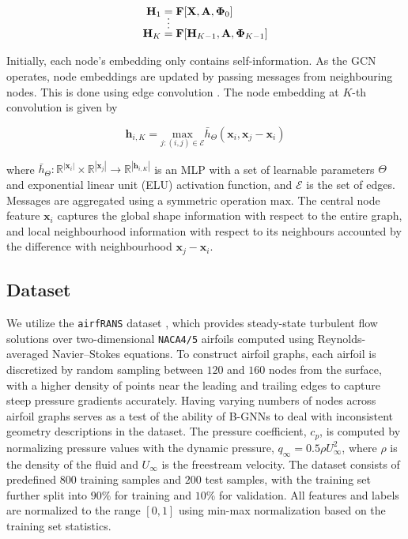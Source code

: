 \documentclass{marine_2025_paper_template}
\begin{document}
\begin{align}
  \mathbf{H}_1 & = \mathbf{F}[\mathbf{X}, \mathbf{A}, \mathbf{\Phi}_{0}] \\
               & \shortvdotswithin{ = } \notag \\[-3.5ex]
  \mathbf{H}_K & = \mathbf{F}[\mathbf{H}_{K-1}, \mathbf{A}, \mathbf{\Phi}_{K-1}]
\end{align}

\noindent
Initially, each node's embedding only contains self-information. As the GCN operates, node embeddings are updated by passing messages from neighbouring nodes. This is done using edge convolution \citep{wang2019}. The node embedding at $K$-th convolution is given by

\begin{equation}
    \mathbf{h}_{i,K} = \underset{j:(i,j)\in \mathcal{E}}{\mathrm{max}} \bar{h}_{\Theta}(\mathbf{x}_i, \mathbf{x}_j - \mathbf{x}_i)
\end{equation}

\noindent where $\bar{h}_{\Theta}: \mathbb{R}^{|\mathbf{x}_i|} \times \mathbb{R}^{|\mathbf{x}_j|} \rightarrow \mathbb{R}^{|\mathbf{h}_{i,K}|}$ is an MLP with a set of learnable parameters $\Theta$ and exponential linear unit (ELU) \citep{clevert2016} activation function, and $\mathcal{E}$ is the set of edges. Messages are aggregated using a symmetric operation $\mathrm{max}$. The central node feature $\mathbf{x}_i$ captures the global shape information with respect to the entire graph, and local neighbourhood information with respect to its neighbours accounted by the difference with neighbourhood $\mathbf{x}_j - \mathbf{x}_i$.

\subsection{Dataset}

We utilize the \texttt{airfRANS} dataset \citep{bonnet2023}, which provides steady-state turbulent flow solutions over two-dimensional \texttt{NACA4/5} airfoils computed using Reynolds-averaged Navier–Stokes equations.  To construct airfoil graphs, each airfoil is discretized by random sampling between $120$ and $160$ nodes from the surface, with a higher density of points near the leading and trailing edges to capture steep pressure gradients accurately. Having varying numbers of nodes across airfoil graphs serves as a test of the ability of B-GNNs to deal with inconsistent geometry descriptions in the dataset. The pressure coefficient, $c_p$, is computed by normalizing pressure values with the dynamic pressure, $q_{\infty} = 0.5 \rho U_{\infty}^2$, where $\rho$ is the density of the fluid and $U_{\infty}$ is the freestream velocity. The dataset consists of predefined $800$ training samples and $200$ test samples, with the training set further split into $90\%$ for training and $10\%$ for validation. All features and labels are normalized to the range $[0,1]$ using min-max normalization based on the training set statistics.
\end{document}
